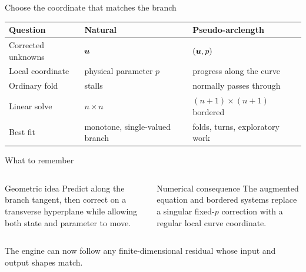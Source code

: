 \begin{frame}{Choose the coordinate that matches the branch}
\small
\begin{center}
\begin{tabular}{p{}p{}p{}}
\toprule
Question & Natural & Pseudo-arclength\\
\midrule
Corrected unknowns & $\bm{u}$ & $(\bm{u},p)$\\
Local coordinate & physical parameter $p$ & progress along the curve\\
Ordinary fold & stalls & normally passes through\\
Linear solve & $n\times n$ & $(n+1)\times(n+1)$ bordered\\
Best fit & monotone, single-valued branch & folds, turns, exploratory work\\
\bottomrule
\end{tabular}
\end{center}
\end{frame}

\begin{frame}{What to remember}
\begin{columns}[T,onlytextwidth]
\begin{block}{Geometric idea}
Predict along the branch tangent, then correct on a transverse hyperplane
while allowing both state and parameter to move.
\end{block}

\begin{block}{Numerical consequence}
The augmented equation and bordered systems replace a singular fixed-$p$
correction with a regular local curve coordinate.
\end{block}
\end{columns}

\vfill
\centering
\large\textcolor{JaxTeal}{The engine can now follow any finite-dimensional residual whose input and output shapes match.}
\end{frame}
